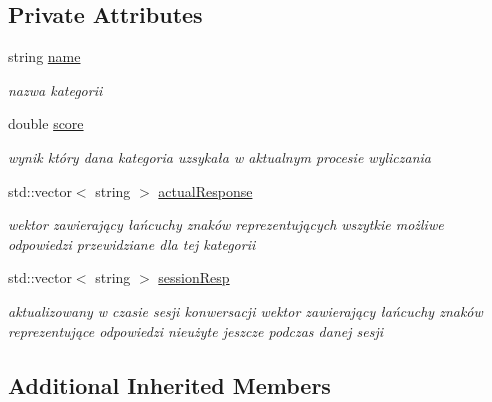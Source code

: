 \subsection*{Private Attributes}
\begin{DoxyCompactItemize}
\item 
\mbox{\label{class_category_a1451292f5ff9ab85db5a16d8842040b3}} 
string \mbox{\hyperlink{class_category_a1451292f5ff9ab85db5a16d8842040b3}{name}}
\begin{DoxyCompactList}\small\item\em nazwa kategorii \end{DoxyCompactList}\item 
\mbox{\label{class_category_acc0a14213d6dc429cba0344b3709a08f}} 
double \mbox{\hyperlink{class_category_acc0a14213d6dc429cba0344b3709a08f}{score}}
\begin{DoxyCompactList}\small\item\em wynik który dana kategoria uzsykała w aktualnym procesie wyliczania \end{DoxyCompactList}\item 
\mbox{\label{class_category_ac5ec22045669ac0bfaa3b1c93520d3b0}} 
std\+::vector$<$ string $>$ \mbox{\hyperlink{class_category_ac5ec22045669ac0bfaa3b1c93520d3b0}{actual\+Response}}
\begin{DoxyCompactList}\small\item\em wektor zawierający łańcuchy znaków reprezentujących wszytkie możliwe odpowiedzi przewidziane dla tej kategorii \end{DoxyCompactList}\item 
\mbox{\label{class_category_a90339f08c3895d5a0c8c1fc487bb8512}} 
std\+::vector$<$ string $>$ \mbox{\hyperlink{class_category_a90339f08c3895d5a0c8c1fc487bb8512}{session\+Resp}}
\begin{DoxyCompactList}\small\item\em aktualizowany w czasie sesji konwersacji wektor zawierający łańcuchy znaków reprezentujące odpowiedzi nieużyte jeszcze podczas danej sesji \end{DoxyCompactList}\end{DoxyCompactItemize}
\subsection*{Additional Inherited Members}


